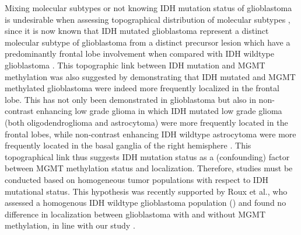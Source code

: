 Mixing molecular subtypes or not knowing \gls{IDH} mutation status of glioblastoma is undesirable when assessing topographical distribution of molecular subtypes \autocite{louis20162016}, since it is now known that \gls{IDH} mutated glioblastoma represent a distinct molecular subtype of glioblastoma from a distinct precursor lesion which have a predominantly frontal lobe involvement when compared with IDH wildtype glioblastoma \autocite{lai2011evidence}.
This topographic link between \gls{IDH} mutation and \gls{MGMT} methylation was also suggested by  demonstrating that \gls{IDH} mutated and \gls{MGMT} methylated glioblastoma were indeed more frequently localized in the frontal lobe.
This has not only been demonstrated in glioblastoma but also in non-contrast enhancing low grade glioma in which \gls{IDH} mutated low grade glioma (both oligodendroglioma and astrocytoma) were more frequently located in the frontal lobes, while non-contrast enhancing IDH wildtype astrocytoma were more frequently located in the basal ganglia of the right hemisphere \autocite{chaichana2011factors}.
This topographical link thus suggests \gls{IDH} mutation status as a (confounding) factor between \gls{MGMT} methylation status and localization.
Therefore, studies must be conducted based on homogeneous tumor populations with respect to \gls{IDH} mutational status.
This hypothesis was recently supported by Roux et al., who assessed a homogenous \gls{IDH} wildtype glioblastoma population () and found no difference in localization between glioblastoma with and without MGMT methylation, in line with our study \autocite{roux2019mri}.

